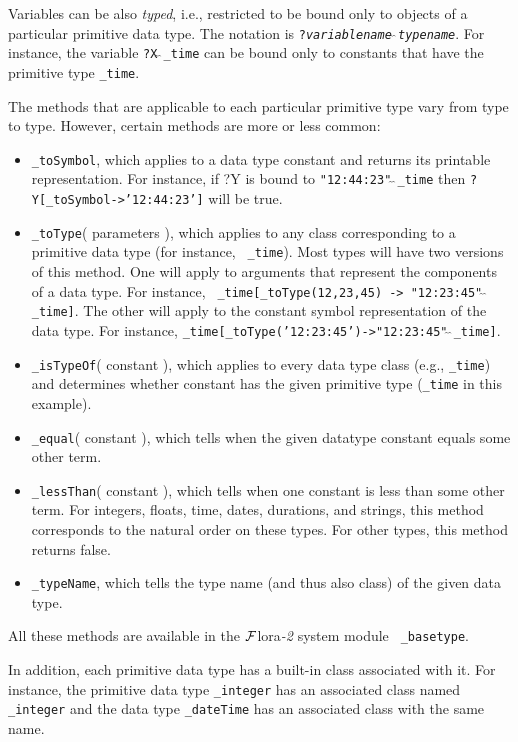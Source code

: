 \documentclass[11pt]{article}
\newcommand{\FLORA}{{\mbox{\sc ${\cal F}${lora}\rm\emph{-2}}}\xspace}
\begin{document}
Variables can be also \emph{typed}, i.e., restricted to be bound only to 
objects of a particular primitive data type. The notation is
{\tt ?\emph{variablename}$\hat{~}\hat{~}$\emph{typename}}. 
For instance, the variable {\tt ?X$\hat{~}\hat{~}$\_time}  
can be bound only to constants that have the primitive type {\tt \_time}. 

The methods that are applicable to each particular primitive type vary from
type to type. However, certain methods are more or less common:

 \begin{itemize}
    \item {\tt \_toSymbol}, which applies to a data type constant and
      returns its printable representation. For instance, if ?Y is bound to
      {\tt "12:44:23"$\hat{~}\hat{~}$\_time} then {\tt ?Y[\_toSymbol->'12:44:23']} will
      be true.
    \item {\tt \_toType}( parameters ), which applies to any class
      corresponding to a primitive data type (for instance, {\tt
        \_time}). Most types will have two versions of this method. One
      will apply to arguments that represent the components of a data
      type. For instance, {\tt
        \_time[\_toType(12,23,45) -> "12:23:45"$\hat{~}\hat{~}$\_time]}.  The other will
      apply to the constant symbol representation of the data type. For instance,
      {\tt \_time[\_toType('12:23:45')->"12:23:45"$\hat{~}\hat{~}$\_time]}. 
    \item {\tt \_isTypeOf}( constant ), which applies to every data type
      class (e.g., {\tt \_time}) and determines whether constant has the
      given primitive type ({\tt \_time} in this example).
    \item {\tt \_equal}( constant ), which tells when the given datatype constant equals some other term.
    \item {\tt \_lessThan}( constant ), which tells when one constant is
      less than some other term. For integers, floats, time, dates,
      durations, and strings, this method corresponds to the natural order
      on these types. For other types, this method returns false.
    \item {\tt \_typeName}, which tells the type name (and thus also class)
      of the given data type.
    \end{itemize}

    All these methods are available in the \FLORA system module {\tt
      \_basetype}. 

In addition, each primitive data type has a built-in class associated with it.
For instance, the primitive data type {\tt \_integer} has an associated
class  named {\tt \_integer} and the data type {\tt \_dateTime} has an
associated class with the same name.  
\end{document}
